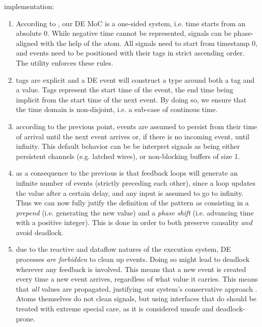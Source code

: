 implementation:\par
                 \begin{enumerate}
                 \item 
                 According to \cite{Lee98}, our DE MoC is
 a one-sided system, i.e. time starts from an absolute 0. While
 negative time cannot be represented, signals can be phase-aligned
 with the help of the  atom. All signals
 need to start from timestamp 0, and events need to be positioned
 with their tags in strict ascending order. The 
 utility enforces these rules.\par
                 
                 \item 
                 tags are explicit and a DE event will construct a type around
 both a tag and a value. Tags represent the start time of the
 event, the end time being implicit from the start time of the
 next event. By doing so, we ensure that the time domain is
 non-disjoint, i.e. a sub-case of continous time. \par
                 
                 \item 
                 according to the previous point, events are assumed to persist
 from their time of arrival until the next event arrives or, if
 there is no incoming event, until infinity. This default behavior
 can be be interpret signals as being either persistent channels
 (e.g. latched wires), or non-blocking buffers of size 1.\par
                 
                 \item 
                 as a consequence to the previous is that feedback loops will
 generate an infinite number of events (strictly preceding each
 other), since a loop updates the value after a certain delay, and
 any input is assumed to go to infinity. Thus we can now fully
 jutify the definition of the  pattern as
 consisting in a \emph{prepend} (i.e. generating the new value) and a
 \emph{phase shift} (i.e. advancing time with a positive integer). This
 is done in order to both preserve causality \emph{and} avoid deadlock.\par
                 
                 \item 
                 due to the reactive and dataflow natures of the execution
 system, DE processes \emph{are forbidden} to clean up events. Doing so
 might lead to deadlock wherever any feedback is involved. This
 means that a new event is created every time a new event arrives,
 regardless of what value it carries. This means that \emph{all} values
 are propagated, justifying our system's conservative approach
 \cite{Fujimoto00}. Atoms themselves do not
 clean signals, but using interfaces that do should be treated
 with extreme special care, as it is considered unsafe and
 deadlock-prone.\par
                 

\end{enumerate}
